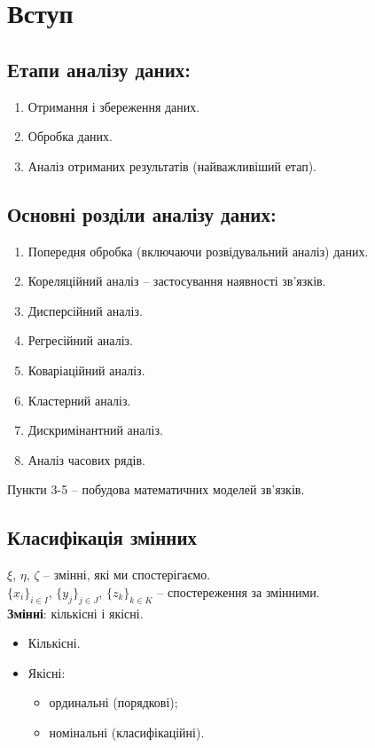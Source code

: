 
\section{Вступ}

\subsection{Етапи аналізу даних:}
\begin{enumerate}
	\item Отримання і збереження даних.
	\item Обробка даних.
	\item Аналіз отриманих результатів (найважливіший етап).
\end{enumerate}

\subsection{Основні розділи аналізу даних:}
\begin{enumerate}
	\item Попередня обробка (включаючи розвідувальний аналіз) даних.
	\item Кореляційний аналіз -- застосування наявності зв'язків.
	\item Дисперсійний аналіз.
	\item Регресійний аналіз.
	\item Коваріаційний аналіз.
	\item Кластерний аналіз.
	\item Дискримінантний аналіз.
	\item Аналіз часових рядів.
\end{enumerate}

Пункти 3-5 -- побудова математичних моделей зв'язків.

\subsection{Класифікація змінних}

$\xi$, $\eta$, $\zeta$ -- змінні, які ми спостерігаємо. \\

$\{x_i\}_{i \in I}$, $\{y_j\}_{j \in J}$, $\{z_k\}_{k \in K}$ -- спостереження за змінними. \\

\textbf{Змінні}: кількісні і якісні.
\begin{itemize}
	\item Кількісні.
	\item Якісні:
	\begin{itemize}
		\item ординальні (порядкові);
		\item номінальні (класифікаційні).
	\end{itemize}
\end{itemize}

